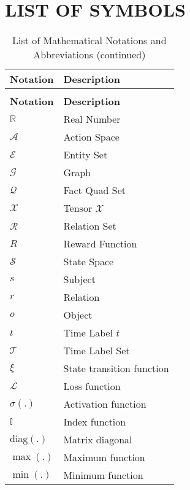\chapter*{\MakeUppercase{List of Symbols}}


\begin{longtable}{p{} p{}}
\toprule
\textbf{Notation} & \textbf{Description} \\
\midrule
\endfirsthead
\caption[]{List of Mathematical Notations and Abbreviations (continued)} \\
\toprule
\textbf{Notation} & \textbf{Description} \\
\midrule
\endhead
\bottomrule
\endfoot
$\mathbb{R}$ & Real Number \\
$\mathcal{A}$ & Action Space \\
$\mathcal{E}$ & Entity Set \\
$\mathcal{G}$ & Graph \\
$\mathcal{Q}$ & Fact Quad Set \\
$\bm{\mathscr{X}}$ & Tensor $\bm{\mathscr{X}}$ \\
$\mathcal{R}$ & Relation Set \\
$R$ & Reward Function \\
$\mathcal{S}$ & State Space \\
$s$ & Subject \\
$r$ & Relation \\
$o$ & Object \\
$t$ & Time Label $t$ \\
$\mathcal{T}$ & Time Label Set \\
$\xi$ & State transition function \\
$\mathcal{L}$ & Loss function \\
$\sigma(.)$ & Activation function \\
$\mathbb{I}$ & Index function \\
$\text{diag}(.)$ & Matrix diagonal \\
$\max(.)$ & Maximum function \\
$\min(.)$ & Minimum function \\
\end{longtable}


\newpage